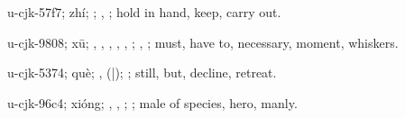 \begin{multicols}{2}
{\cjkgGlue{}u-cjk-57f7; zhí; \cjkgGlue{}\cjkgGlue{}\cjkgGlue{}; \cjkgGlue{}, \cjkgGlue{}; hold in hand, keep, carry out.

\cjkgGlue{}u-cjk-9808; xū; \cjkgGlue{}\cjkgGlue{}\cjkgGlue{}, \cjkgGlue{}, \cjkgGlue{}, \cjkgGlue{}, \cjkgGlue{}\cjkgGlue{}\cjkgGlue{}, \cjkgGlue{}\cjkgGlue{}\cjkgGlue{}; \cjkgGlue{}, \cjkgGlue{}; must, have to, necessary, moment, whiskers.

\cjkgGlue{}u-cjk-5374; què; \cjkgGlue{}\cjkgGlue{}\cjkgGlue{}, \cjkgGlue{}\cjkgGlue{}(\cjkgGlue{}|\cjkgGlue{}); \cjkgGlue{}; still, but, decline, retreat.

\cjkgGlue{}u-cjk-96c4; xióng; \cjkgGlue{}, \cjkgGlue{}, \cjkgGlue{}; \cjkgGlue{}; male of species, hero, manly.

}
\end{multicols}
